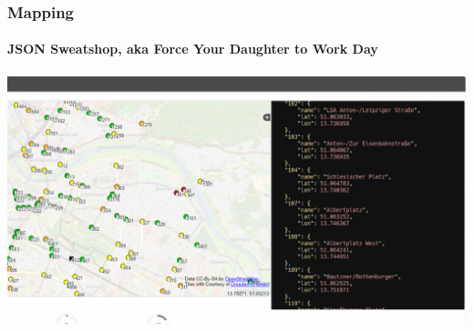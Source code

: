 \begin{frame}
  \frametitle{Mapping}
  \framesubtitle{JSON Sweatshop, aka Force Your Daughter to Work Day}
  \centering
  \includegraphics[width=.8\textwidth]{./figs/urbic-osint-json.png}
\end{frame}

